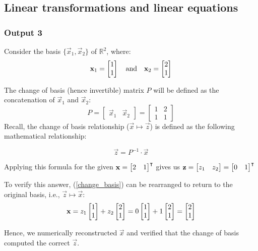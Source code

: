 \documentclass[10pt]{article}
\begin{document}
\subsection{Linear transformations and linear equations}
\subsubsection{Output 3}
Consider the basis $\{\vec{x}_1, \vec{x}_2\}$ of $\mathbb{R}^2$, where:
\begin{equation*}
    \mathbf{x}_1 = \begin{bmatrix} 1\\1 \end{bmatrix}
    \quad
    \text{and}
    \quad
    \mathbf{x}_2 = \begin{bmatrix} 2\\1 \end{bmatrix}
\end{equation*}

The change of basis (hence invertible) matrix $P$ will be defined as the concatenation of $\vec{x}_1$ and $\vec{x}_2$:
\begin{equation*}
    P =
        \begin{bmatrix}
            \vec{x}_1 & \vec{x}_2
        \end{bmatrix} = 
        \begin{bmatrix}
            1 & 2\\1 & 1
        \end{bmatrix}
\end{equation*}
Recall, the change of basis relationship ($\vec{x} \mapsto \vec{z} $)  is defined as the following mathematical relationship:

\begin{equation} \label{change_basis}
    \vec{z} = P^{-1} \cdot \vec{x}
\end{equation}

Applying this formula for the given $\mathbf{x} = \begin{bmatrix} 2 & 1 \end{bmatrix}^\intercal$ gives us $\mathbf{z} = \begin{bmatrix} z_1 & z_2 \end{bmatrix} = \begin{bmatrix} 0 & 1 \end{bmatrix}^\intercal$

To verify this answer, (\ref{change_basis}) can be rearranged to return to the original basis, i.e., $\vec{z} \mapsto \vec{x} $:
\begin{equation*}
    \mathbf{x} = z_1\begin{bmatrix} 1\\1 \end{bmatrix} + z_2\begin{bmatrix} 2\\1 \end{bmatrix} = 0\begin{bmatrix} 1\\1 \end{bmatrix} + 1\begin{bmatrix} 2\\1 \end{bmatrix} = \begin{bmatrix} 2\\1 \end{bmatrix}
\end{equation*}

Hence, we numerically reconstructed $\vec{x}$ and verified that the change of basis computed the correct $\vec{z}$.
\end{document}
